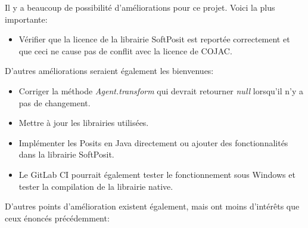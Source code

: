 Il y a beaucoup de possibilité d'améliorations pour ce projet. Voici la plus importante:

\begin{itemize}
    \item Vérifier que la licence de la librairie \gls{SoftPosit} est reportée correctement et que ceci ne cause pas de conflit avec la licence de \gls{COJAC}.
\end{itemize}

D'autres améliorations seraient également les bienvenues:

\begin{itemize}
    \item Corriger la méthode \textit{Agent.transform} qui devrait retourner \textit{null} lorsqu'il n'y a pas de changement.
    \item Mettre à jour les librairies utilisées.
    \item Implémenter les \glspl{Posit} en Java directement ou ajouter des fonctionnalités dans la librairie \gls{SoftPosit}.
    \item Le GitLab CI pourrait également tester le fonctionnement sous Windows et tester la compilation de la librairie native.
\end{itemize}

D'autres points d'amélioration existent également, mais ont moins d'intérêts que ceux énoncés précédemment:


